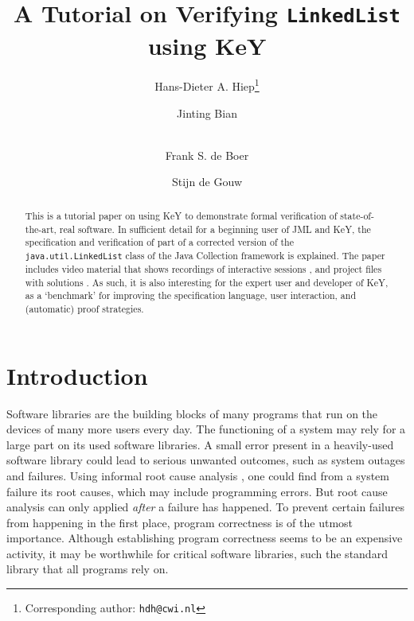 \documentclass[runningheads]{llncs}
\begin{document}
\renewcommand{\thelstlisting}{\arabic{lstlisting}}

\title{A Tutorial on Verifying \texttt{LinkedList} using KeY}
\author{{Hans-Dieter} A. Hiep\footnote{Corresponding author: \texttt{hdh@cwi.nl}} \and Jinting Bian \and\\
Frank S. de Boer \and Stijn de Gouw}


\maketitle

\begin{abstract}
This is a tutorial paper on using KeY to demonstrate formal verification of state-of-the-art, real software. In sufficient detail for a beginning user of JML and KeY, the specification and verification of part of a corrected version of the \texttt{java.util.LinkedList} class of the Java Collection framework is explained. The paper includes video material that shows recordings of interactive sessions , and project files with solutions . As such, it is also interesting for the expert user and developer of KeY, as a `benchmark' for improving the specification language, user interaction, and (automatic) proof strategies.
\end{abstract}


\section{Introduction}

Software libraries are the building blocks of many programs that run on the devices of many more users every day. The functioning of a system may rely for a large part on its used software libraries. A small error present in a heavily-used software library could lead to serious unwanted outcomes, such as system outages and failures. Using informal root cause analysis \cite{rooney2004root}, one could find from a system failure its root causes, which may include programming errors. But root cause analysis can only applied \emph{after} a failure has happened. To prevent certain failures from happening in the first place, program correctness is of the utmost importance. Although establishing program correctness seems to be an expensive activity, it may be worthwhile for critical software libraries, such the standard library that all programs rely on.
\end{document}
